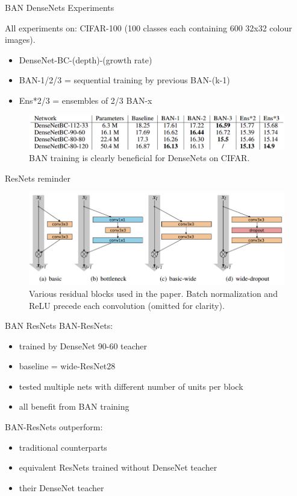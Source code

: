\documentclass{beamer}
\begin{document}
\begin{frame}{BAN DenseNets Experiments }

All experiments on: CIFAR-100 (100 classes each containing 600 32x32 colour images).

\begin{itemize}
\item DenseNet-BC-(depth)-(growth rate)
\item BAN-1/2/3 = sequential training by previous BAN-(k-1)
\item Ens*2/3 = ensembles of 2/3 BAN-x
\end{itemize}

\begin{figure}[h]
\includegraphics[width=\textwidth]{img/denseNet_experiment}
\caption{BAN training is clearly beneficial for DenseNets on CIFAR. \cite{cit:ban}}
\end{figure}

\end{frame}
\begin{frame}{ResNets reminder}
\begin{figure}[h]
\includegraphics[width=\textwidth]{img/resnet_blocks}
\caption{Various residual blocks used in the paper. Batch normalization and ReLU precede
each convolution (omitted for clarity). \cite{cit:resnet}}
\end{figure}
\end{frame}
\begin{frame}{BAN ResNets}
BAN-ResNets:
\begin{itemize}
\item trained by DenseNet 90-60 teacher
\item baseline = wide-ResNet28 \cite{cit:resnet}
\item tested multiple nets with different number of units per block
\item all benefit from BAN training
\end{itemize}

\vfill

BAN-ResNets outperform:
\begin{itemize}
\item traditional counterparts
\item equivalent ResNets trained without DenseNet teacher
\item their DenseNet teacher
\end{itemize}
\end{frame}
\end{document}

